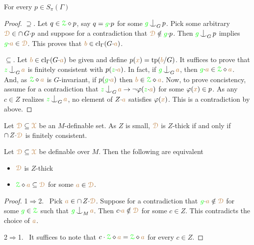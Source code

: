 \begin{fact}
  For every $p\in S_\pi(\Gamma)$\smallskip

\end{fact}

\begin{proof}
  $\supseteq$.
  Let $q\in{\color{green}\EuScript Z}\diamond p$, say $q={\color{green} g}{\cdot}p$ for some ${\gr g}\nonfork_G p$.
  Pick some arbitrary ${\color{brown}\EuScript D}\in \cap\,G{\cdot}p$ and suppose for a contradiction that ${\color{brown}\EuScript D}\notin{\color{green}g}{\cdot}p$.
  Then ${\gr g}\nonfork_G p$ implies ${\color{green} g}{\cdot}{\color{brown} a}\in{\color{brown}\EuScript D}$.
  This proves that ${\color{brown} b}\in{\rm cl}_\Gamma(G{\cdot}{\color{brown} a})$.
  
  $\subseteq$.
  Let ${\color{brown} b}\in{\rm cl}_\Gamma(G{\cdot}{\color{brown} a})$ be given and define $p({\color{brown} x})={\rm tp}({\color{brown} b}/G)$.
  It suffices to prove that ${\gr z}\nonfork_G{\mr a}$ is finitely consistent with $p({\color{green} z}{\cdot}{\color{brown} a})$.
  In fact, if ${\gr g}\nonfork_G{\mr a}$, then ${\color{green} g}{\cdot}{\color{brown} a}\in{\color{green}\EuScript Z}\diamond {\color{brown}a}$.
  And, as ${\color{green}\EuScript Z}\diamond {\color{brown}a}$ is $G$-invariant, if $p({\color{green} g}{\cdot}{\color{brown} a})$ then ${\color{brown} b}\in{\color{green}\EuScript Z}\diamond{\color{brown}a}$.
  Now, to prove concistency, assume for a contradiction that ${\gr z}\nonfork_G {\mr a}\rightarrow\neg\varphi({\gr z}{\cdot}{\mr a})$ for some $\varphi({\color{brown} x})\in p$.
  As any $c\in Z$ realizes ${\gr z}\nonfork_G {\mr a}$, no element of $Z{\cdot}{\color{brown} a}$ satisfies $\varphi({\color{brown} x})$.
  This is a contradiction by  above.
\end{proof}


Let ${\color{brown}\EuScript D}\subseteq{\color{brown}\EuScript X}$ be an $M$-definable set.
As $Z$ is small, ${\color{brown}\EuScript D}$ is $Z$-thick if and only if $\cap\,Z{\cdot}{\color{brown}\EuScript D}$ is finitely consistent.

\begin{fact}\label{fact_thick_circ}
  Let ${\color{brown}\EuScript D}\subseteq{\color{brown}\EuScript X}$ be definable over $M$.
  Then the following are equivalent
  \begin{itemize}
    \item [1.] ${\color{brown}\EuScript D}$ is $Z$-thick
    \item [2.] ${\color{green}\EuScript Z}\diamond {\color{brown}a}\subseteq{\color{brown}\EuScript D}$ for some ${\color{brown} a}\in{\color{brown}\EuScript D}$.
  \end{itemize}
\end{fact}

\begin{proof}
  1$\Rightarrow$2. \ 
  Pick ${\color{brown} a}\in\cap\,Z{\cdot}{\color{brown}\EuScript D}$.
  Suppose for a contradiction that ${\color{green} g}{\cdot}{\color{brown} a}\notin{\color{brown}\EuScript D}$ for some ${\color{green} g}\in{\color{green}\EuScript Z}$ such that ${\gr g}\nonfork_M {\mr a}$.
  Then $c{\cdot}{\color{brown} a}\notin{\color{brown}\EuScript D}$ for some $c\in Z$.
  This contradicts the choice of ${\color{brown} a}$.  

  2$\Rightarrow$1. \ 
  It suffices to note that $c\cdot{\color{green}\EuScript Z}\diamond {\color{brown}a}={\color{green}\EuScript Z}\diamond {\color{brown}a}$ for every $c\in Z$.
\end{proof}

